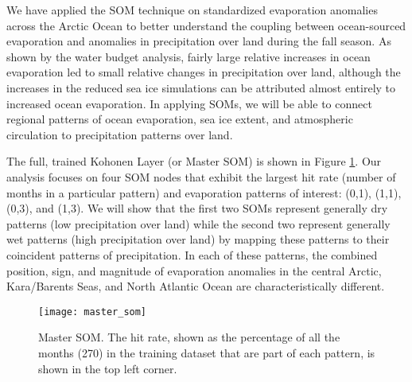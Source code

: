We have applied the SOM technique on standardized evaporation anomalies across the Arctic Ocean to better understand the coupling between ocean-sourced evaporation and anomalies in precipitation over land during the fall season.
As shown by the water budget analysis, fairly large relative increases in ocean evaporation led to small relative changes in precipitation over land, although the increases in the reduced sea ice simulations can be attributed almost entirely to increased ocean evaporation.
In applying SOMs, we will be able to connect regional patterns of ocean evaporation, sea ice extent, and atmospheric circulation to precipitation patterns over land.

The full, trained Kohonen Layer (or Master SOM) is shown in Figure \ref{fig:master_som}.
Our analysis focuses on four SOM nodes that exhibit the largest hit rate (number of months in a particular pattern) and evaporation patterns of interest: (0,1), (1,1), (0,3), and (1,3). %
We will show that the first two SOMs represent generally dry patterns (low precipitation over land) while the second two represent generally wet patterns (high precipitation over land) by mapping these patterns to their coincident patterns of precipitation.
In each of these patterns, the combined position, sign, and magnitude of evaporation anomalies in the central Arctic, Kara/Barents Seas, and North Atlantic Ocean are characteristically different.

\begin{figure}
  \centering
  \texttt{[image: master\_som]}
  \caption{Master SOM. The hit rate, shown as the percentage of all the months (270) in the training dataset that are part of each pattern, is shown in the top left corner.} %
  \label{fig:master_som}
\end{figure}

